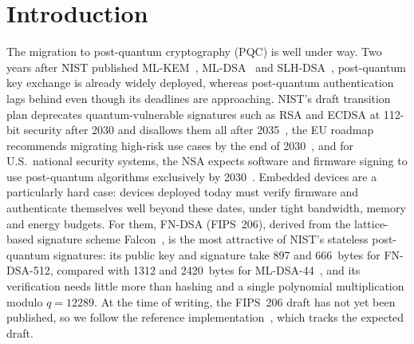 \section{Introduction}
\label{sec:intro}

The migration to post-quantum cryptography (PQC) is well under way.
Two years after NIST published ML-KEM~\cite{FIPS203}, ML-DSA~\cite{FIPS204}
and SLH-DSA~\cite{FIPS205}, post-quantum key exchange is already widely
deployed, whereas post-quantum authentication lags behind even though its
deadlines are approaching.
NIST's draft transition plan deprecates quantum-vulnerable signatures such as
RSA and ECDSA at 112-bit security after 2030 and disallows them all after
2035~\cite{NISTIR8547}, the EU roadmap recommends migrating high-risk use
cases by the end of 2030~\cite{EUPQC25}, and for U.S.\ national security
systems, the NSA expects software and firmware signing to use post-quantum
algorithms exclusively by 2030~\cite{CNSA2}.
Embedded devices are a particularly hard case: devices deployed today must
verify firmware and authenticate themselves well beyond these dates, under
tight bandwidth, memory and energy budgets.
For them, FN-DSA (FIPS~206), derived from the lattice-based signature scheme
Falcon~\cite{Falcon}, is the most attractive of NIST's stateless post-quantum
signatures: its public key and signature take 897 and 666~bytes for
FN-DSA-512, compared with 1312 and 2420~bytes for ML-DSA-44~\cite{FIPS204},
and its verification needs little more than hashing and a single polynomial
multiplication modulo $q=12289$.
At the time of writing, the FIPS~206 draft has not yet been published, so we
follow the reference implementation~\cite{cfndsa}, which tracks the expected
draft.

